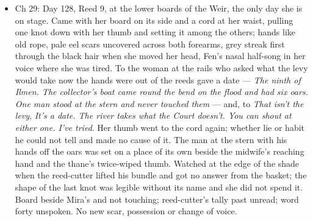 \documentclass{design/chronicle}
\begin{document}
{\begin{itemize}[leftmargin=1.4em,itemsep=1pt,topsep=3pt,parsep=0pt]
\end{itemize}

\begin{itemize}[leftmargin=1.4em,itemsep=1pt,topsep=3pt,parsep=0pt]

\item Ch 29: Day 128, Reed 9, at the lower boards of the Weir, the only day she is on stage. Came with her board on its side and a cord at her waist, pulling one knot down with her thumb and setting it among the others; hands like old rope, pale eel scars uncovered across both forearms, grey streak first through the black hair when she moved her head, Fen’s nasal half-song in her voice where she was tired. To the woman at the rails who asked what the levy would take now the hands were out of the reeds gave a date — \emph{The ninth of Ilmen. The collector’s boat came round the bend on the flood and had six oars. One man stood at the stern and never touched them} — and, to \emph{That isn’t the levy}, \emph{It’s a date. The river takes what the Court doesn’t. You can shout at either one. I’ve tried}. Her thumb went to the cord again; whether lie or habit he could not tell and made no cause of it. The man at the stern with his hands off the oars was set on a place of its own beside the midwife’s reaching hand and the thane’s twice-wiped thumb. Watched at the edge of the shade when the reed-cutter lifted his bundle and got no answer from the basket; the shape of the last knot was legible without its name and she did not spend it. Board beside Mira’s and not touching; reed-cutter’s tally past unread; word forty unspoken. No new scar, possession or change of voice.

\end{itemize}
}
\end{document}
